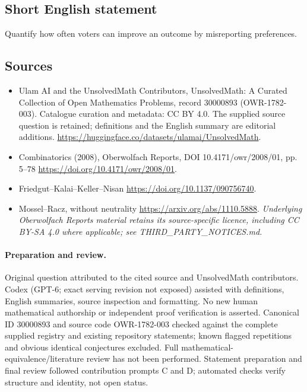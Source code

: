 \documentclass[11pt]{article}
\begin{document}
\subsection{Short English statement}
Quantify how often voters can improve an outcome by misreporting preferences.
\subsection{Sources}
\begin{itemize}
\item[\hypertarget{source:30000893:1}{S1}] Ulam AI and the UnsolvedMath Contributors, UnsolvedMath: A Curated Collection of Open Mathematics Problems, record 30000893 (OWR-1782-003). Catalogue curation and metadata: CC BY 4.0. The supplied source question is retained; definitions and the English summary are editorial additions.
\url{https://huggingface.co/datasets/ulamai/UnsolvedMath}.
\item[\hypertarget{source:30000893:2}{S2}] Combinatorics (2008), Oberwolfach Reports, DOI 10.4171/owr/2008/01, pp. 5--78
\url{https://doi.org/10.4171/owr/2008/01}.
\item[\hypertarget{source:30000893:3}{S3}] Friedgut--Kalai--Keller--Nisan
\url{https://doi.org/10.1137/090756740}.
\item[\hypertarget{source:30000893:4}{S4}] Mossel--Racz, without neutrality
\url{https://arxiv.org/abs/1110.5888}.
\textit{Underlying Oberwolfach Reports material retains its source-specific licence, including CC BY-SA 4.0 where applicable; see THIRD\_PARTY\_NOTICES.md.}
\end{itemize}
\paragraph{Preparation and review.}
Original question attributed to the cited source and UnsolvedMath contributors. Codex (GPT-6; exact serving revision not exposed) assisted with definitions, English summaries, source inspection and formatting. No new human mathematical authorship or independent proof verification is asserted. Canonical ID 30000893 and source code OWR-1782-003 checked against the complete supplied registry and existing repository statements; known flagged repetitions and obvious identical conjectures excluded. Full mathematical-equivalence/literature review has not been performed. Statement preparation and final review followed contribution prompts C and D; automated checks verify structure and identity, not open status.
\label{end:30000893}
\end{document}
